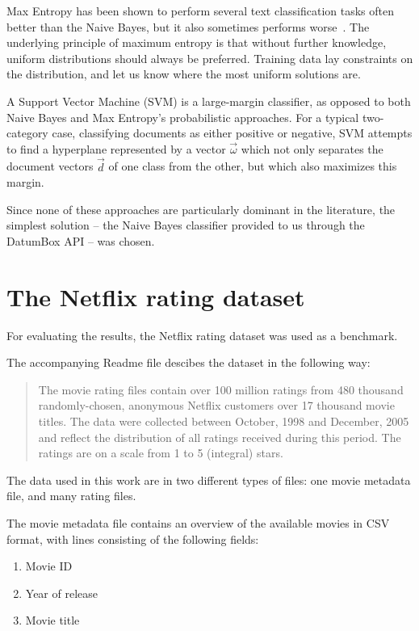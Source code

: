 Max Entropy has been shown to perform several text classification tasks often better than the Naive Bayes, but it also sometimes performs worse~\cite{Nigam99usingmaximum}. The underlying principle of maximum entropy is that without further knowledge, uniform distributions should always be preferred. Training data lay constraints on the distribution, and let us know where the most uniform solutions are.

A Support Vector Machine (SVM) is a large-margin classifier, as opposed to both Naive Bayes and Max Entropy's probabilistic approaches. For a typical two-category case, classifying documents as either positive or negative, SVM attempts to find a hyperplane represented by a vector $\vec{\omega}$ which not only separates the document vectors $\vec{d}$ of one class from the other, but which also maximizes this margin.

Since none of these approaches are particularly dominant in the literature, the simplest solution -- the Naive Bayes classifier provided to us through the DatumBox API -- was chosen.

\section{The Netflix rating dataset}
\label{sec:netflix_dataset}

For evaluating the results, the Netflix rating dataset was used as a benchmark.

The accompanying Readme file descibes the dataset in the following way:

\begin{quote}
  The movie rating files contain over 100 million ratings from 480 thousand
  randomly-chosen, anonymous Netflix customers over 17 thousand movie titles.  The
  data were collected between October, 1998 and December, 2005 and reflect the
  distribution of all ratings received during this period.  The ratings are on a
  scale from 1 to 5 (integral) stars.
\end{quote}

The data used in this work are in two different types of files: one movie metadata file, and many rating files.

The movie metadata file contains an overview of the available movies in CSV format, with lines consisting of the following fields:

\begin{enumerate}
  \item Movie ID
  \item Year of release
  \item Movie title
\end{enumerate}

